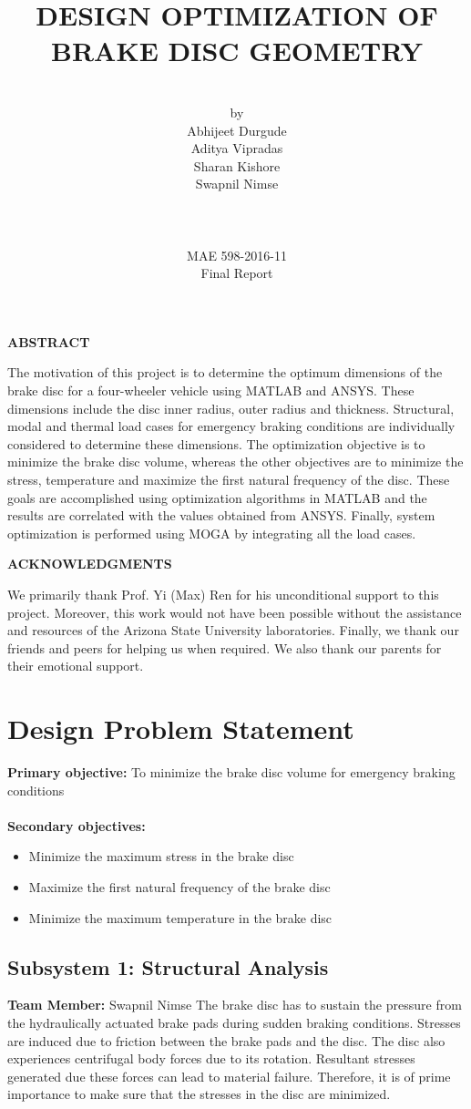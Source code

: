 \documentclass[12pt]{article}
\title{\textbf{DESIGN OPTIMIZATION OF BRAKE DISC GEOMETRY}}
\author{\\by \\Abhijeet Durgude\\ Aditya Vipradas\\ Sharan Kishore\\ Swapnil Nimse\\\\\\\\MAE 598-2016-11\\Final Report}
\begin{document}
\maketitle
\vspace{1cm}
\begin{center}
\textbf{ABSTRACT}
\end{center}
The motivation of this project is to determine the optimum dimensions of the brake disc for a four-wheeler vehicle using MATLAB and ANSYS. These dimensions include the disc inner radius, outer radius and thickness. Structural, modal and thermal load cases for emergency braking conditions are individually considered to determine these dimensions. The optimization objective is to minimize the brake disc volume, whereas the other objectives are to minimize the stress, temperature and maximize the first natural frequency of the disc. These goals are accomplished using optimization algorithms in MATLAB and the results are correlated with the values obtained from ANSYS. Finally, system optimization is performed using MOGA by integrating all the load cases. 
\newpage  
\begin{center}
\textbf{ACKNOWLEDGMENTS}
\end{center}
We primarily thank Prof. Yi (Max) Ren for his unconditional support to this project. Moreover, this work would not have been possible without the assistance and resources of the Arizona State University laboratories. Finally, we thank our friends and peers for helping us when required. We also thank our parents for their emotional support.
\newpage
\tableofcontents
\newpage  
\listoffigures
\newpage  
\listoftables
\newpage
\section{Design Problem Statement}
\textbf{Primary objective:} To minimize the brake disc volume for emergency braking conditions\\\\
\textbf{Secondary objectives: }
\begin{itemize}
\item Minimize the maximum stress in the brake disc
\item Maximize the first natural frequency of the brake disc
\item Minimize the maximum temperature in the brake disc
\end{itemize}
\subsection{\textbf{Subsystem 1:} Structural Analysis}
\textbf{Team Member:} Swapnil Nimse 
\newline\newline
The brake disc has to sustain the pressure from the hydraulically actuated brake pads during sudden braking conditions. Stresses are induced due to friction between the brake pads and the disc. The disc also experiences centrifugal body forces due to its rotation. Resultant stresses generated due these forces can lead to material failure. Therefore, it is of prime importance to make sure that the stresses in the disc are minimized. 
\end{document}
